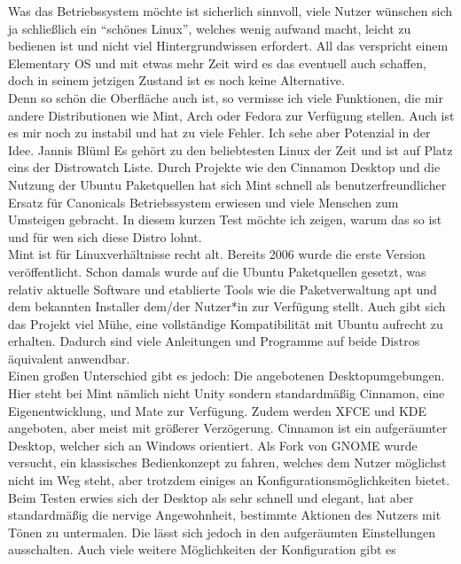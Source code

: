{{        Was das Betriebssystem möchte ist sicherlich sinnvoll, viele Nutzer wünschen sich ja schließlich ein "`schönes Linux"', welches wenig aufwand macht, leicht zu bedienen ist und nicht viel Hintergrundwissen erfordert. All das verspricht einem Elementary OS und mit etwas mehr Zeit wird es das eventuell auch schaffen, doch in seinem jetzigen Zustand ist es noch keine Alternative. \\
        Denn so schön die Oberfläche auch ist, so vermisse ich viele Funktionen, die mir andere Distributionen wie Mint, Arch oder Fedora zur Verfügung stellen. Auch ist es mir noch zu instabil und hat zu viele Fehler. Ich sehe aber Potenzial in der Idee. }
    {Jannis Blüml}
    {Es gehört zu den beliebtesten Linux der Zeit und ist auf Platz eins der Distrowatch Liste. Durch Projekte wie den Cinnamon Desktop und
        die Nutzung der Ubuntu Paketquellen hat sich Mint schnell als benutzerfreundlicher Ersatz für Canonicals Betriebssystem erwiesen
        und viele Menschen zum Umsteigen gebracht. In diesem kurzen Test möchte ich zeigen, warum das so ist und für wen sich diese Distro lohnt.\\
        Mint ist für Linuxverhältnisse recht alt. Bereits 2006 wurde die erste Version veröffentlicht. Schon damals wurde auf die Ubuntu Paketquellen
        gesetzt, was relativ aktuelle Software und etablierte Tools wie die Paketverwaltung apt und dem bekannten Installer
        dem/der Nutzer*in zur Verfügung stellt. Auch gibt sich das Projekt viel Mühe, eine vollständige Kompatibilität mit Ubuntu aufrecht zu erhalten.
        Dadurch sind viele Anleitungen und Programme auf beide Distros
        äquivalent anwendbar.\\
        Einen großen Unterschied gibt es jedoch: Die angebotenen Desktopumgebungen. Hier steht bei Mint nämlich nicht Unity sondern standardmäßig
        Cinnamon, eine Eigenentwicklung, und Mate zur Verfügung. Zudem werden XFCE und KDE angeboten, aber meist mit größerer Verzögerung.
        Cinnamon ist ein aufgeräumter Desktop, welcher sich an Windows orientiert. Als Fork von GNOME wurde versucht, ein klassisches Bedienkonzept
        zu fahren, welches dem Nutzer möglichst nicht im Weg steht, aber trotzdem einiges an Konfigurationsmöglichkeiten bietet. Beim Testen erwies
        sich der Desktop als sehr schnell und elegant, hat aber standardmäßig die nervige Angewohnheit, bestimmte Aktionen des Nutzers mit Tönen zu
        untermalen. Die lässt sich jedoch in den aufgeräumten Einstellungen ausschalten. Auch viele weitere Möglichkeiten der Konfiguration gibt es
}}
